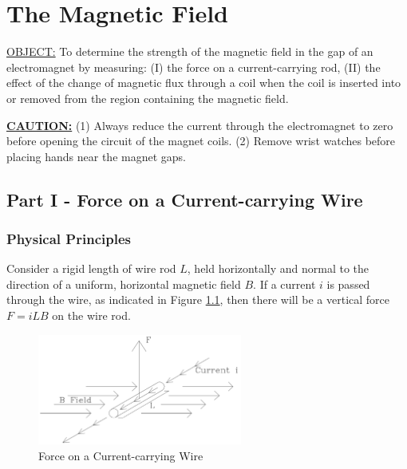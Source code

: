\chapter{The Magnetic Field}
   \underline{OBJECT:} To determine the strength of the magnetic field in the gap of an electromagnet by measuring: (I) the force on a current-carrying rod, (II) the effect of the change of magnetic flux through a coil when the coil is inserted into or removed from the region containing the magnetic field.\myskip

\underline{\textbf{CAUTION:}} 
(1) Always reduce the current through the electromagnet to zero before opening the circuit of the magnet coils. 
(2) Remove wrist watches before placing hands near the magnet gaps.


\section{Part I - Force on a Current-carrying Wire}
\subsection{Physical Principles}
Consider a rigid length of wire rod $L$, held horizontally and normal to the direction of a uniform, horizontal magnetic field $B$. If a current $i$ is passed through the wire, as indicated in Figure {\ref{fig:force}}, then there will be a vertical force $F=iLB$ on the wire rod.
\begin{figure}[h]
\centering
\includegraphics[width=0.6\textwidth]{./Exp4/pic/image1.png}
\caption{Force on a Current-carrying Wire}
\label{fig:force}
\end{figure} 

